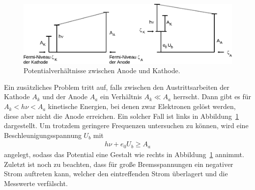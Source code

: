 \begin{figure}[H]
	\centering
	\includegraphics[width=0.9\linewidth]{content/grafik/potential.pdf}
	\caption{Potentialverhältnisse zwischen Anode und Kathode.}
	\label{fig:potential}
\end{figure}
\vspace{-2ex}
Ein zusätzliches Problem tritt auf, falls zwischen den Austrittsarbeiten der Kathode $A_k$ und der Anode $A_a$ ein Verhältnis $A_k \ll A_a$
herrscht. Dann gibt es für $A_k < h\nu < A_a$ kinetische Energien, bei denen zwar Elektronen gelöst werden, diese aber nicht die Anode erreichen.
Ein solcher Fall ist links in Abbildung~\ref{fig:potential} dargestellt. Um trotzdem geringere Frequenzen untersuchen zu können, wird eine
Beschleunigungsspannung $U_b$ mit
\begin{align}
	h\nu + e_0 U_b \geq A_a
	\label{eqn:potential}
\end{align}
angelegt, sodass das Potential eine Gestalt wie rechts in Abbildung~\ref{fig:potential} annimmt. Zuletzt ist noch zu beachten, dass für
große Bremsspannungen ein negativer Strom auftreten kann, welcher den eintreffenden Strom überlagert und die Messwerte verfälscht.

